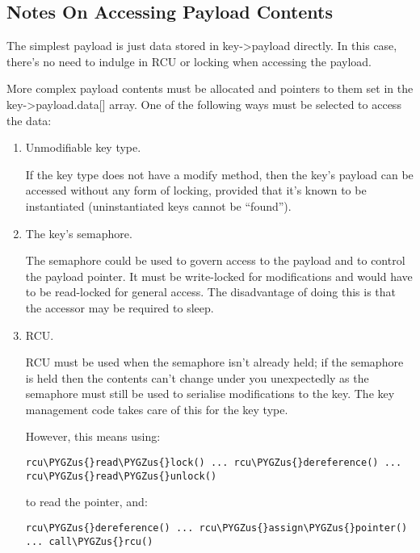 \documentclass[a4paper,8pt,english]{sphinxmanual}
\def\PYGZus{\char`\_}
\begin{document}
\subsection{Notes On Accessing Payload Contents}
\label{security/keys/core:notes-on-accessing-payload-contents}
The simplest payload is just data stored in key-\textgreater{}payload directly.  In this
case, there's no need to indulge in RCU or locking when accessing the payload.

More complex payload contents must be allocated and pointers to them set in the
key-\textgreater{}payload.data{[}{]} array.  One of the following ways must be selected to
access the data:
\begin{enumerate}
\item {} 
Unmodifiable key type.

If the key type does not have a modify method, then the key's payload can
be accessed without any form of locking, provided that it's known to be
instantiated (uninstantiated keys cannot be ``found'').

\item {} 
The key's semaphore.

The semaphore could be used to govern access to the payload and to control
the payload pointer. It must be write-locked for modifications and would
have to be read-locked for general access. The disadvantage of doing this
is that the accessor may be required to sleep.

\item {} 
RCU.

RCU must be used when the semaphore isn't already held; if the semaphore
is held then the contents can't change under you unexpectedly as the
semaphore must still be used to serialise modifications to the key. The
key management code takes care of this for the key type.

However, this means using:

\begin{Verbatim}[commandchars=\\\{\}]
rcu\PYGZus{}read\PYGZus{}lock() ... rcu\PYGZus{}dereference() ... rcu\PYGZus{}read\PYGZus{}unlock()
\end{Verbatim}

to read the pointer, and:

\begin{Verbatim}[commandchars=\\\{\}]
rcu\PYGZus{}dereference() ... rcu\PYGZus{}assign\PYGZus{}pointer() ... call\PYGZus{}rcu()
\end{Verbatim}


\end{enumerate}
\end{document}
